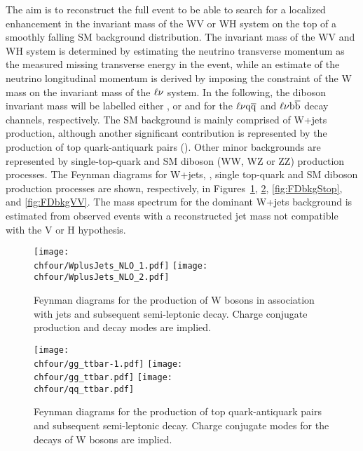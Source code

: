 The aim is to reconstruct the full event to be able to search for a localized enhancement in the invariant mass of the WV or WH system on the top of a smoothly falling SM background distribution.
The invariant mass of the WV and WH system is determined by estimating the neutrino transverse momentum as the measured missing transverse energy in the event,
while an estimate of the neutrino longitudinal momentum is derived by imposing the constraint of the W mass on the invariant mass of the $\ell\nu$ system.
In the following, the diboson invariant mass will be labelled either \mlvj, or \mWV and \mWH for the $\ell\nu\mathrm{q}\overline{\mathrm{q}}$ and $\ell\nu{\mathrm{b}\overline{\mathrm{b}}}$ decay channels, respectively.
The SM background is mainly comprised of W+jets production, although another significant contribution is represented by the production of top quark-antiquark pairs (\ttbar).
Other minor backgrounds are represented by single-top-quark and SM diboson (WW, WZ or ZZ) production processes.
The Feynman diagrams for W+jets, \ttbar, single top-quark and SM diboson production processes are shown, respectively, in Figures~\ref{fig:FDbkgWJets}, \ref{fig:FDbkgttbar}, \ref{fig:FDbkgStop}, and \ref{fig:FDbkgVV}.
The mass spectrum for the dominant W+jets background is estimated from observed events with a reconstructed jet mass not compatible with the V or H hypothesis.\\ 

\begin{figure}[!htb]
\centering
\texttt{[image: \\chfour/WplusJets\_NLO\_1.pdf]}
\texttt{[image: \\chfour/WplusJets\_NLO\_2.pdf]}
\caption{Feynman diagrams for the production of W bosons in association with jets and subsequent semi-leptonic decay. Charge conjugate production and decay modes are implied.}
\label{fig:FDbkgWJets}
\end{figure}

\begin{figure}[!htb]
\centering
\texttt{[image: \\chfour/gg\_ttbar-1.pdf]}
\texttt{[image: \\chfour/gg\_ttbar.pdf]}
\texttt{[image: \\chfour/qq\_ttbar.pdf]}
\caption{Feynman diagrams for the production of top quark-antiquark pairs and subsequent semi-leptonic decay. Charge conjugate modes for the decays of W bosons are implied.}
\label{fig:FDbkgttbar}
\end{figure}

